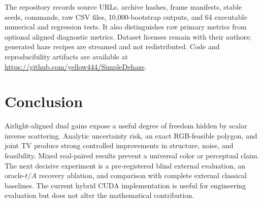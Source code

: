 \documentclass[10pt,twocolumn]{article}
\begin{document}
The repository records source URLs, archive hashes, frame manifests, stable seeds, commands,
raw CSV files, 10,000-bootstrap outputs, and 64 executable numerical and regression tests. It also distinguishes
raw primary metrics from optional aligned diagnostic metrics. Dataset licenses remain with their
authors; generated haze recipes are streamed and not redistributed.
Code and reproducibility artifacts are available at
\url{https://github.com/yellow444/SimpleDehaze}.

\section{Conclusion}
Airlight-aligned dual gains expose a useful degree of freedom hidden by scalar inverse scattering.
Analytic uncertainty risk, an exact RGB-feasible polygon, and joint TV produce strong controlled
improvements in structure, noise, and feasibility. Mixed real-paired results prevent a universal
color or perceptual claim. The next decisive experiment is a pre-registered blind external
evaluation, an oracle-$t/A$ recovery ablation, and comparison with complete external classical
baselines. The current hybrid CUDA implementation is useful for engineering evaluation but does
not alter the mathematical contribution.



\end{document}
